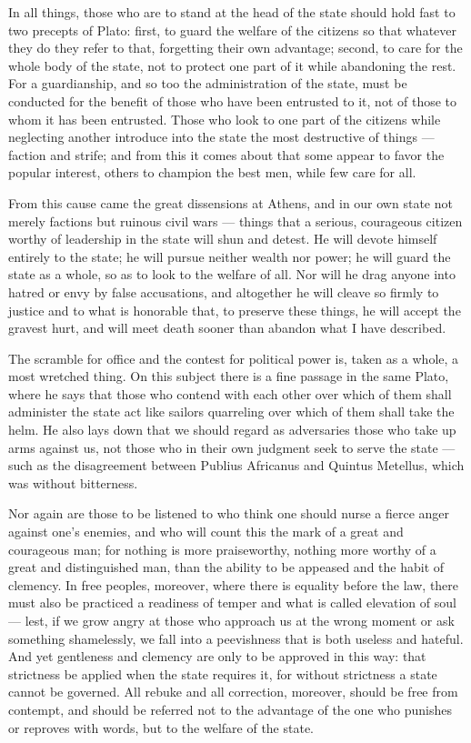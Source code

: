  In all things, those who are to stand at the head of the state should hold fast to two precepts of Plato: first, to guard the welfare of the citizens so that whatever they do they refer to that, forgetting their own advantage; second, to care for the whole body of the state, not to protect one part of it while abandoning the rest. For a guardianship, and so too the administration of the state, must be conducted for the benefit of those who have been entrusted to it, not of those to whom it has been entrusted. Those who look to one part of the citizens while neglecting another introduce into the state the most destructive of things — faction and strife; and from this it comes about that some appear to favor the popular interest, others to champion the best men, while few care for all.

 From this cause came the great dissensions at Athens, and in our own state not merely factions but ruinous civil wars — things that a serious, courageous citizen worthy of leadership in the state will shun and detest. He will devote himself entirely to the state; he will pursue neither wealth nor power; he will guard the state as a whole, so as to look to the welfare of all. Nor will he drag anyone into hatred or envy by false accusations, and altogether he will cleave so firmly to justice and to what is honorable that, to preserve these things, he will accept the gravest hurt, and will meet death sooner than abandon what I have described.

 The scramble for office and the contest for political power is, taken as a whole, a most wretched thing. On this subject there is a fine passage in the same Plato, where he says that those who contend with each other over which of them shall administer the state act like sailors quarreling over which of them shall take the helm. He also lays down that we should regard as adversaries those who take up arms against us, not those who in their own judgment seek to serve the state — such as the disagreement between Publius Africanus and Quintus Metellus, which was without bitterness.

 Nor again are those to be listened to who think one should nurse a fierce anger against one's enemies, and who will count this the mark of a great and courageous man; for nothing is more praiseworthy, nothing more worthy of a great and distinguished man, than the ability to be appeased and the habit of clemency. In free peoples, moreover, where there is equality before the law, there must also be practiced a readiness of temper and what is called elevation of soul — lest, if we grow angry at those who approach us at the wrong moment or ask something shamelessly, we fall into a peevishness that is both useless and hateful. And yet gentleness and clemency are only to be approved in this way: that strictness be applied when the state requires it, for without strictness a state cannot be governed. All rebuke and all correction, moreover, should be free from contempt, and should be referred not to the advantage of the one who punishes or reproves with words, but to the welfare of the state.

